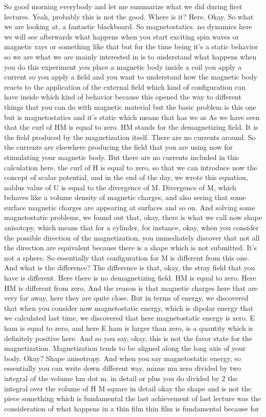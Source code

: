 So good morning everybody and let me summarize what we did during first lectures. Yeah, probably this is not the good. Where is it? Here. Okay. So what we are looking at, a fantastic blackboard. So magnetostatics. no dynamics here we will see afterwards what happens when you start exciting spin waves or magnetic rays or something like that but for the time being it's a static behavior so we are what we are mainly interested in is to understand what happens when you do this experiment you place a magnetic body inside a coil you apply a current so you apply a field and you want to understand how the magnetic body reacts to the application of the external field which kind of configuration can have inside which kind of behavior because this opened the way to different things that you can do with magnetic material but the basic problem is this one but is magnetostatics and it's static which means that has we as As we have seen that the curl of HM is equal to zero. HM stands for the demagnetizing field. It is the field produced by the magnetization itself. There are no currents around. So the currents are elsewhere producing the field that you are using now for stimulating your magnetic body. But there are no currents included in this calculation here. the curl of H is equal to zero, so that we can introduce now the concept of scalar potential, and in the end of the day, we wrote this equation, nablus value of U is equal to the divergence of M. Divergence of M, which behaves like a volume density of magnetic charges, and also seeing that some surface magnetic charges are appearing at surfaces and so on. And solving some magnetostatic problems, we found out that, okay, there is what we call now shape anisotopy, which means that for a cylinder, for instance, okay, when you consider the possible direction of the magnetization, you immediately discover that not all the direction are equivalent because there is a shape which is not submitted. It's not a sphere. So essentially that configuration for M is different from this one. And what is the difference? The difference is that, okay, the stray field that you have is different. Here there is no demagnetizing field. HM is equal to zero. Here HM is different from zero. And the reason is that magnetic charges here that are very far away, here they are quite close. But in terms of energy, we discovered that when you consider now magnetostatic energy, which is dipolar energy that we calculated last time, we discovered that here magnetostatic energy is zero. E ham is equal to zero, and here E ham is larger than zero, is a quantity which is definitely positive here. And so you say, okay, this is not the favor state for the magnetization. Magnetization tends to be aligned along the long axis of your body. Okay? Shape anisotropy. And when you say magnetostatic energy, so essentially you can write down different way, minus mu zero divided by two integral of the volume hm dot m. in detail or plus you do divided by 2 the integral over the volume of H M square in detail okay the shape and is not the piece something which is fundamental the last achievement of last lecture was the consideration of what happens in a thin film thin film is fundamental because for 
